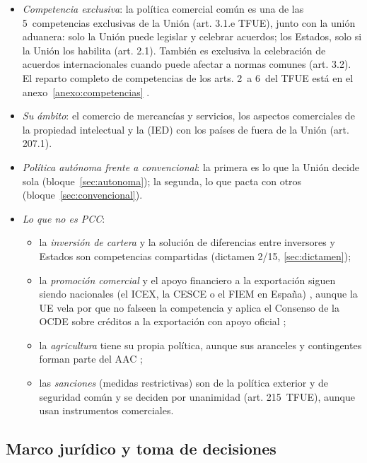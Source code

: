 \documentclass[11pt]{article}
\begin{document}
\begin{itemize}
\item \emph{Competencia exclusiva}: la política comercial común es una de las 5~competencias exclusivas de la Unión (art. 3.1.e TFUE), junto con la unión aduanera: solo la Unión puede legislar y celebrar acuerdos; los Estados, solo si la Unión los habilita (art. 2.1). También es exclusiva la celebración de acuerdos internacionales cuando puede afectar a normas comunes (art. 3.2). El reparto completo de competencias de los arts. 2~a 6~del TFUE está en el anexo~\ref{anexo:competencias} .
\item \emph{Su ámbito}: el comercio de mercancías y servicios, los aspectos comerciales de la propiedad intelectual y la  (IED) con los países de fuera de la Unión (art. 207.1).
\item \emph{Política autónoma frente a convencional}: la primera es lo que la Unión decide sola (bloque~\ref{sec:autonoma}); la segunda, lo que pacta con otros (bloque~\ref{sec:convencional}).
\item \emph{Lo que no es PCC}:
  \begin{itemize}
  \item la \emph{inversión de cartera} y la solución de diferencias entre inversores y Estados son competencias compartidas (dictamen 2/15, \ref{sec:dictamen});
  \item la \emph{promoción comercial} y el apoyo financiero a la exportación siguen siendo nacionales (el ICEX, la CESCE o el FIEM en España)  , aunque la UE vela por que no falseen la competencia y aplica el Consenso de la OCDE sobre créditos a la exportación con apoyo oficial ;
  \item la \emph{agricultura} tiene su propia política, aunque sus aranceles y contingentes forman parte del AAC ;
  \item las \emph{sanciones} (medidas restrictivas) son de la política exterior y de seguridad común y se deciden por unanimidad (art. 215~TFUE), aunque usan instrumentos comerciales.
  \end{itemize}
\end{itemize}

\subsection{Marco jurídico y toma de decisiones}\label{sec:juridico}
\end{document}

